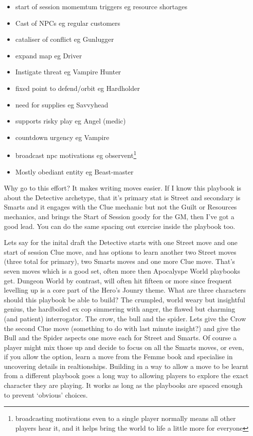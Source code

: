 \documentclass{tufte-handout}
\begin{document}
\begin{itemize}
\item start of session momemtum triggers eg resource shortages
\item Cast of NPCs  eg regular customers
\item cataliser of conflict eg Gunlugger
\item expand map eg Driver
\item Instigate threat eg Vampire Hunter
\item fixed point to defend/orbit eg Hardholder
\item need for supplies eg Savvyhead
\item supports risky play eg Angel (medic)
\item countdown urgency eg Vampire
\item broadcast npc motivations eg observent\footnote{broadcasting motivations even to a single player normally means all other players hear it, and it helps bring the world to life a little more for everyone}
\item Mostly obediant entity eg Beast-master
\end{itemize}

Why go to this effort? It makes writing moves easier. If I know this playbook is about the Detective archetype, that it's primary stat is Street and secondary is Smarts and it engages with the Clue mechanic but not the Guilt or Resources mechanics, and brings the Start of Session goody for the GM, then I've got a good lead. You can do the same spacing out exercise inside the playbook too. 

Lets say for the inital draft the Detective starts with one Street move and one start of session Clue move, and has options to learn another two Street moves (three total for primary), two Smarts moves and one more Clue move. That's seven moves which is a good set, often more then Apocalyspe World playbooks get. Dungeon World by contrast, will often hit fifteen or more since frequent levelling up is a core part of the Hero's Jounry theme. 
What are three characters should this playbook be able to build? The crumpled, world weary but insightful genius, the hardboiled ex cop simmering with anger, the flawed but charming (and patient) interrogator. The crow, the bull and the spider.
Lets give the Crow the second Clue move (something to do with last minute insight?) and give the Bull and the Spider aspects one move each for Street and Smarts. Of course a player might mix those up and decide to focus on all the Smarts moves, or even, if you allow the option, learn a move from the Femme book and specialise in uncovering details in realtionships. Building in a way to allow a move to be learnt from a different playbook goes a long way to allowing players to explore the exact character they are playing. It works as long as the playbooks are spaced enough to prevent `obvious' choices.
 
\end{document}
